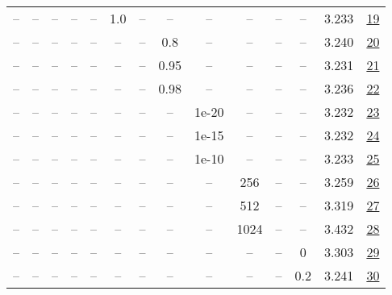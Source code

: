 \begin{table}[H]
\begin{tabular}{cccccccccccccc}
-- & -- & -- & -- & -- & 1.0 & -- & -- & -- & -- & -- & -- & 3.233 & \href{https://wandb.ai/stanford-mercury/optimizer-scaling/runs/sweep-300m-6B-sciond35f816lr0.008-wd0.1-minlr0-warmup0-b10.98-gn-b2bf17}{19} \\
-- & -- & -- & -- & -- & -- & -- & 0.8 & -- & -- & -- & -- & 3.240 & \href{https://wandb.ai/stanford-mercury/optimizer-scaling/runs/sweep-300m-6B-sciondb93cablr0.008-wd0.1-minlr0-warmup0-b10.98-gn-7a2ff9}{20} \\
-- & -- & -- & -- & -- & -- & -- & 0.95 & -- & -- & -- & -- & 3.231 & \href{https://wandb.ai/stanford-mercury/optimizer-scaling/runs/sweep-300m-6B-sciond26da5flr0.008-wd0.1-minlr0-warmup0-b10.98-gn-4234e5}{21} \\
-- & -- & -- & -- & -- & -- & -- & 0.98 & -- & -- & -- & -- & 3.236 & \href{https://wandb.ai/stanford-mercury/optimizer-scaling/runs/sweep-300m-6B-sciondba6c4clr0.008-wd0.1-minlr0-warmup0-b10.98-gn-60d1af}{22} \\
-- & -- & -- & -- & -- & -- & -- & -- & 1e-20 & -- & -- & -- & 3.232 & \href{https://wandb.ai/stanford-mercury/optimizer-scaling/runs/sweep-300m-6B-sciond2cd962lr0.008-wd0.1-minlr0-warmup0-b10.98-gn-9ae6b3}{23} \\
-- & -- & -- & -- & -- & -- & -- & -- & 1e-15 & -- & -- & -- & 3.232 & \href{https://wandb.ai/stanford-mercury/optimizer-scaling/runs/sweep-300m-6B-sciond1c6c6alr0.008-wd0.1-minlr0-warmup0-b10.98-gn-39d488}{24} \\
-- & -- & -- & -- & -- & -- & -- & -- & 1e-10 & -- & -- & -- & 3.233 & \href{https://wandb.ai/stanford-mercury/optimizer-scaling/runs/sweep-300m-6B-sciondbedd5alr0.008-wd0.1-minlr0-warmup0-b10.98-gn-03c420}{25} \\
-- & -- & -- & -- & -- & -- & -- & -- & -- & 256 & -- & -- & 3.259 & \href{https://wandb.ai/stanford-mercury/optimizer-scaling/runs/sweep-300m-6B-sciond8e6297lr0.008-wd0.1-minlr0-warmup0-b10.98-gn-6108e9}{26} \\
-- & -- & -- & -- & -- & -- & -- & -- & -- & 512 & -- & -- & 3.319 & \href{https://wandb.ai/stanford-mercury/optimizer-scaling/runs/sweep-300m-6B-sciond374b61lr0.008-wd0.1-minlr0-warmup0-b10.98-gn-c7f214}{27} \\
-- & -- & -- & -- & -- & -- & -- & -- & -- & 1024 & -- & -- & 3.432 & \href{https://wandb.ai/stanford-mercury/optimizer-scaling/runs/sweep-300m-6B-sciond7a848flr0.008-wd0.1-minlr0-warmup0-b10.98-gn-9d7008}{28} \\
-- & -- & -- & -- & -- & -- & -- & -- & -- & -- & -- & 0 & 3.303 & \href{https://wandb.ai/stanford-mercury/optimizer-scaling/runs/sweep-300m-6B-sciond3438f5lr0.008-wd0-minlr0-warmup0-b10.98-gn2--e2425a}{29} \\
-- & -- & -- & -- & -- & -- & -- & -- & -- & -- & -- & 0.2 & 3.241 & \href{https://wandb.ai/stanford-mercury/optimizer-scaling/runs/sweep-300m-6B-sciond9f11fclr0.008-wd0.2-minlr0-warmup0-b10.98-gn-585125}{30} \\
\bottomrule
\end{tabular}
\end{table}

